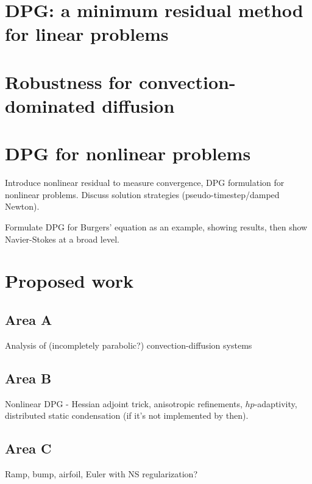 \documentclass{article}
\begin{document}
\section{DPG: a minimum residual method for linear problems}



\section{Robustness for convection-dominated diffusion}

\section{DPG for nonlinear problems}

Introduce nonlinear residual to measure convergence, DPG formulation for nonlinear problems. Discuss solution strategies (pseudo-timestep/damped Newton). 

Formulate DPG for Burgers' equation as an example, showing results, then show Navier-Stokes at a broad level. 

\section{Proposed work}

\subsection{Area A}

Analysis of (incompletely parabolic?) convection-diffusion systems

\subsection{Area B}

Nonlinear DPG - Hessian adjoint trick, anisotropic refinements, $hp$-adaptivity, distributed static condensation (if it's not implemented by then). 

\subsection{Area C}

Ramp, bump, airfoil, Euler with NS regularization?



\end{document}
